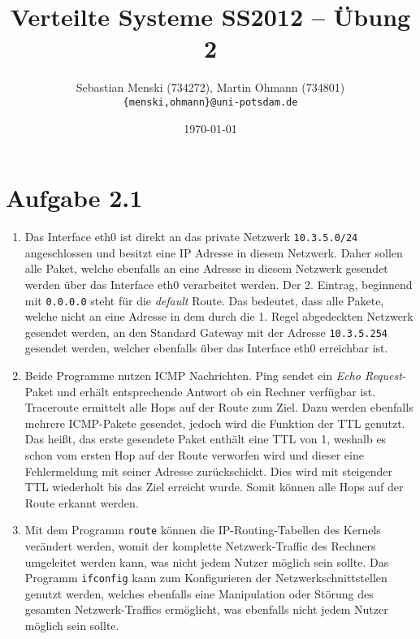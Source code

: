 \documentclass[german,12pt,a4paper]{article}
\begin{document}
\title{\textbf{Verteilte Systeme SS2012 -- Übung 2}}
\author{Sebastian Menski (734272), Martin Ohmann (734801) \\ \texttt{\{menski,ohmann\}@uni-potsdam.de}}
\date{\today}

\maketitle

\section*{Aufgabe 2.1}

\begin{enumerate}

	\item Das Interface eth0 ist direkt an das private Netzwerk \texttt{10.3.5.0/24} angeschlossen und
	besitzt eine IP Adresse in diesem Netzwerk. Daher sollen alle Paket, welche ebenfalls an eine
	Adresse in diesem Netzwerk gesendet werden über das Interface eth0 verarbeitet werden. Der 2.
	Eintrag, beginnend mit \texttt{0.0.0.0} steht für die \textit{default} Route. Das bedeutet, dass
	alle Pakete, welche nicht an eine Adresse in dem durch die 1. Regel abgedeckten Netzwerk gesendet
	werden, an den Standard Gateway mit der Adresse \texttt{10.3.5.254} gesendet werden, welcher
	ebenfalls über das Interface eth0 erreichbar ist.

	\item Beide Programme nutzen ICMP Nachrichten. Ping sendet ein \textit{Echo Request}-Paket und
	erhält entsprechende Antwort ob ein Rechner verfügbar ist. Traceroute ermittelt alle Hops auf der
	Route zum Ziel. Dazu werden ebenfalls mehrere ICMP-Pakete gesendet, jedoch wird die Funktion der
	TTL genutzt. Das heißt, das erste gesendete Paket enthält eine TTL von 1, weshalb es schon vom
	ersten Hop auf der Route verworfen wird und dieser eine Fehlermeldung mit seiner Adresse
	zurückschickt. Dies wird mit steigender TTL wiederholt bis das Ziel erreicht wurde. Somit können
	alle Hops auf der Route erkannt werden.

	\item Mit dem Programm \texttt{route} können die IP-Routing-Tabellen des Kernels verändert werden,
	womit der komplette Netzwerk-Traffic des Rechners umgeleitet werden kann, was nicht jedem Nutzer
	möglich sein sollte. Das Programm \texttt{ifconfig} kann zum Konfigurieren der
	Netzwerkschnittstellen genutzt werden, welches ebenfalls eine Manipulation oder Störung des
	gesamten Netzwerk-Traffics ermöglicht, was ebenfalls nicht jedem Nutzer möglich sein sollte.

\end{enumerate}
\end{document}

